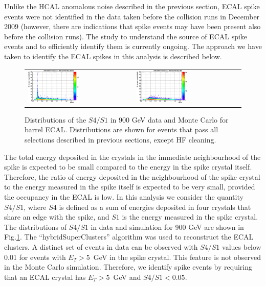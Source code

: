Unlike the HCAL anomalous noise described in the previous section, ECAL
spike events were not identified in the data taken before the collision runs
in December 2009 (however, there are indications that spike events may
have been present also before the collision runs). The study to understand the
source of ECAL spike events and to efficiently identify them is
currently ongoing. The approach we have taken to identify the ECAL
spikes in this analysis is described below.

\begin{figure}[h]
 \centering
 \begin{tabular}{ll}
\includegraphics[width=0.5\textwidth]{plots_ecalnoise/ECalSeedET_Vs_S4_DATA900GeV.eps}&
\includegraphics[width=0.5\textwidth]{plots_ecalnoise/ECalSeedET_Vs_S4_MC900GeV.eps}\\
 \end{tabular}
\caption{Distributions of the $S4/S1$ in 900 GeV data and Monte Carlo
  for barrel ECAL. Distributions are shown for events that pass all
  selections described in previous sections, except HF cleaning.}
\label{fig:ecal_noise_1}
\end{figure}

The total energy deposited in the crystals in the immediate
neighbourhood of the spike is expected to be small compared to the
energy in the spike crystal itself. Therefore, the ratio of energy
deposited in the neighbourhood of the spike crystal to the energy
measured in the spike itself is expected to be very small, provided the
occupancy in the ECAL is low. In this analysis we consider the quantity
$S4/S1$, where $S4$ is defined as a sum of energies deposited in four
crystals that share an edge with the spike, and $S1$ is the energy
measured in the spike crystal. The distributions of $S4/S1$ in data and
simulation for 900 GeV are shown in Fig.\ref{fig:ecal_noise_1}. The
``hybridSuperClusters'' algorithm was used to reconstruct the ECAL
clusters. A distinct set of events in data can be observed with $S4/S1$
values below 0.01 for events with $E_T>5$~GeV in the spike
crystal. This feature is not observed in the Monte Carlo
simulation. Therefore, we identify spike events by requiring that an
ECAL crystal has $E_T>5$~GeV and $S4/S1<0.05$.


